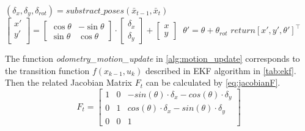 \newcommand{\transfunc}{odometry\_motion\_update}

\begin{algorithm}                      
  \caption{\transfunc ($x_{t-1}$, $u_t$)}         %
\label{alg:motion_update}                           
\begin{algorithmic}[1]                    
  \State $(\delta_{x}, \delta_{y}, \delta_{rot}) = substract\_poses (\bar{x}_{t-1}, \bar{x}_{t})$
  \State $
\begin{bmatrix}
  x'\\ 
  y'\\ 
\end{bmatrix}
= 
\begin{bmatrix}
  \cos\theta  & -\sin\theta \\ 
  \sin\theta &  \cos\theta  
\end{bmatrix}\cdot 
\begin{bmatrix}
  \delta_{x}\\ 
  \delta_{y} 
\end{bmatrix} +
\begin{bmatrix}
  x\\ 
  y 
\end{bmatrix}\
$
\State $\theta' = \theta + \theta_{rot}$ 
\State $return [x', y', \theta']^\top$
\end{algorithmic}
\end{algorithm}

The function \textit{\transfunc} in \autoref{alg:motion_update} corresponds to the transition function $f(x_{k-1}, u_{k})$ described in \gls{EKF} algorithm in \autoref{tab:ekf}. Then the related Jacobian Matrix $F_t$ can be calculated by \autoref{eq:jacobianF}.
\begin{equation}\label{eq:jacobianF} 
F_t = 
\begin{bmatrix}
1 & 0 & -sin(\theta)\cdot \delta_x - cos(\theta)\cdot\delta_y\\ 
0 &  1& cos(\theta)\cdot \delta_x  - sin(\theta)\cdot\delta_y\\ 
0 & 0 & 1
\end{bmatrix} 
\end{equation}

